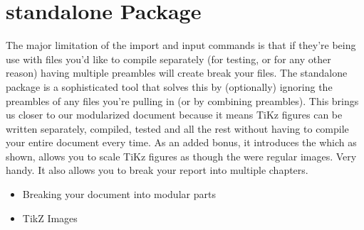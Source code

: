 \documentclass[hidelinks]{article}
\begin{document}
    \section{standalone Package}
        The major limitation of the import and input commands is that if they're being use with files you'd like to compile separately (for testing, or for any other reason) having multiple preambles will create break your files.
        The standalone package is a sophisticated tool that solves this by (optionally) ignoring the preambles of any files you're pulling in (or by combining preambles).
        This brings us closer to our modularized document because it means TiKz figures can be written separately, compiled, tested and all the rest without having to compile your entire document every time.
        As an added bonus, it introduces the \texttt{} which as shown, allows you to scale TiKz figures as though the were regular images.
        Very handy.
        It also allows you to break your report into multiple chapters.
        \begin{itemize}
            \item Breaking your document into modular parts
            \item TikZ Images
        \end{itemize}
\end{document}
